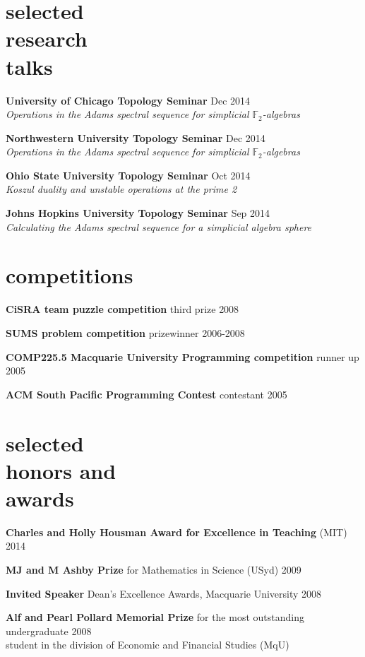 \documentclass[margin,line]{resume}
\newcommand{\whitetab}{\makebox[1cm][r]{ }}
\newcommand{\CVsection}[1]{\section{\mysidestyle #1}}
\newcommand{\entry}[3]{\textbf{#1} #2 \hfill {#3}
           
\vspace{-3.4mm}}
\newcommand{\twolineentry}[4]{\textbf{#1} #2 \hfill {#4}\\%
#3
           
\vspace{-3.4mm}}
\newcommand{\FINALentry}[3]{\textbf{#1} #2 \hfill {#3}\\\vspace{-.55cm}}
\newcommand{\FINALtwolineentry}[4]{\textbf{#1} #2 \hfill {#4}\\%
#3\\\vspace{-.55cm}}
\begin{document}
\begin{resume}
\CVsection{selected\\research\\talks}
\twolineentry{University of Chicago Topology Seminar}{}{\whitetab \emph{Operations in the Adams spectral sequence for simplicial $\mathbb{F}_2$-algebras}}{Dec 2014}%
\twolineentry{Northwestern University Topology Seminar}{}{\whitetab \emph{Operations in the Adams spectral sequence for simplicial $\mathbb{F}_2$-algebras}}{Dec 2014}%
\twolineentry{Ohio State University Topology Seminar}{}{\whitetab \emph{Koszul duality and unstable operations at the prime 2}}{Oct 2014}%
\FINALtwolineentry{Johns Hopkins University Topology Seminar}{}{\whitetab \emph{Calculating the Adams spectral sequence for a simplicial algebra sphere}}{Sep 2014}%

\CVsection{competitions}
\entry{CiSRA team puzzle competition}{third prize}{2008}
\entry{SUMS problem competition}{prizewinner}{2006-2008}%
\entry{COMP225.5 Macquarie University Programming competition}{runner up}{2005}
\FINALentry{ACM South Pacific Programming Contest}{contestant}{2005}

\CVsection{selected\\honors and\\awards} 
\entry{Charles and Holly Housman Award for Excellence in Teaching}{(MIT)}{2014}
\entry{MJ and M Ashby Prize}{for Mathematics in Science (USyd)}{2009}
\entry{Invited Speaker}{Dean's Excellence Awards, Macquarie University}{2008}
\FINALtwolineentry{Alf and Pearl Pollard Memorial Prize}{for the most outstanding undergraduate}{student in the division of Economic and Financial Studies (MqU)}{2008}




\end{resume}
\end{document}
